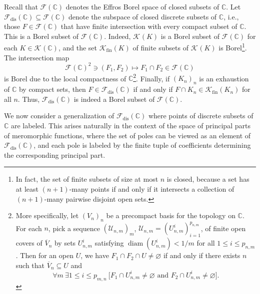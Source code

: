 \documentclass[12pt]{paper}
\numberwithin{equation}{section}
\theoremstyle{plain}
\theoremstyle{definition}
\newcommand{\C}{\mathbb{C}}
\newcommand{\effros}[1]{\mathcal{F}(#1)}
\newcommand{\effrosdis}[1]{\mathcal{F}_{\textrm{dis}}(#1)}
\newcommand{\vietoris}[2][]{\mathcal{K}_{#1}(#2)}
\newcommand{\vietorisfin}[1]{\mathcal{K}_{\textrm{fin}}(#1)}
\DeclareMathOperator*{\diam}{\mathrm{diam}}
\begin{document}
Recall that \(\effros{\C}\) denotes the Effros Borel space of closed subsets of \(\C\).  Let
\(\effrosdis{\C} \subseteq \effros{\C}\) denote the subspace of closed discrete subsets of \(\C\),
i.e., those \(F \in \effros{\C}\) that have finite intersection with every compact subset of
\(\C\). This is a Borel subset of \(\effros{\C}\).
Indeed, \(\vietoris{K}\)
is a Borel subset of \(\effros{\C}\) for each \(K \in \vietoris{\C}\),
and the set \(\vietorisfin{K}\) of finite subsets of \(\vietoris{K}\) is Borel\footnote{
In fact, the set of finite subsets of size at most \(n\) is closed,
because a set has at least \((n+1)\)-many points if and only if it intersects a collection of
\((n+1)\)-many pairwise disjoint open sets.}.
The intersection map
\[
\effros{\C}^{2} \ni (F_{1}, F_{2}) \mapsto F_{1} \cap F_{2} \in \effros{\C}
\]
is Borel due to the local compactness of \(\C\)\footnote{More specifically,
let \((V_{n})_{n}\) be a precompact basis for the
topology on \(\C\). For each \(n\), pick a sequence \((\mathcal{U}_{n,m})_{m}\),
\(\mathcal{U}_{n,m} = (U^{i}_{n,m})_{i=1}^{p_{n,m}}\), of finite open covers of \(\overline{V}_{n}\) by
sets \(U_{n,m}^{i}\) satisfying \(\diam (U^{i}_{n,m}) < 1/m\) for all \(1 \le i \le p_{n,m}\).  Then for an open
\(U\), we have \(F_{1} \cap F_{2} \cap U \ne \varnothing \) if and only if there exists \(n\) such
that \(\overline{V}_{n} \subseteq U\) and
\[\forall m\ \exists 1 \le i \le p_{m,n}\ \bigl[ F_{1} \cap U_{n,m}^{i} \ne \varnothing
  \textrm{ and } F_{2} \cap U_{n,m}^{i} \ne \varnothing\bigr].\]
}.
Finally, if \((K_{n})_{n}\) is an exhaustion of \(\C\) by compact sets,
then \(F \in \effrosdis{\C}\) if and
only if \(F \cap K_{n} \in \vietorisfin{K_{n}}\) for all \(n\). Thus,
\(\effrosdis{\C}\) is indeed a Borel subset of \(\effros{\C}\).

We now consider a generalization of \(\effrosdis{\C}\) where points of discrete subsets of \(\C\)
are labeled.  This arises naturally in the context of the space of principal parts of meromorphic
functions, where the set of poles can be viewed as an element of \(\effrosdis{\C}\), and each pole
is labeled by the finite tuple of coefficients determining the corresponding principal part.
\end{document}
